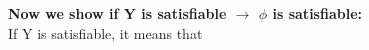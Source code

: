 \documentclass[10pt]{csc_assignment}
\begin{document}
\begin{description}
\textbf{Now we show if Y is satisfiable $\rightarrow$ $\phi$ is satisfiable:}\\

If Y is satisfiable, it means that 
\end{description}
\end{document}
